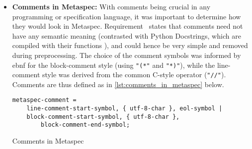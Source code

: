 \begin{itemize}
    \item \textbf{Comments in Metaspec:} With comments being crucial in any programming or specification language, it was important to determine how they would look in Metaspec. 
    Requirement~ states that comments need not have any semantic meaning (contrasted with Python Docstrings, which are compiled with their functions \citep{python_docstrings}), and could hence be very simple and removed during preprocessing. 
    The choice of the comment symbols was informed by \gls{ebnf} for the block-comment style (using \texttt{"(*"} and \texttt{"*)"}), while the line-comment style was derived from the common C-style operator (\texttt{"//"}).
    Comments are thus defined as in \autoref{lst:comments_in_metaspec} below.
\begin{listing}[!htb]
\begin{verbatim}
metaspec-comment =
    line-comment-start-symbol, { utf-8-char }, eol-symbol |
    block-comment-start-symbol, { utf-8-char }, 
        block-comment-end-symbol;
\end{verbatim}
\caption{Comments in Metaspec}
\label{lst:comments_in_metaspec}
\end{listing}
\end{itemize}


